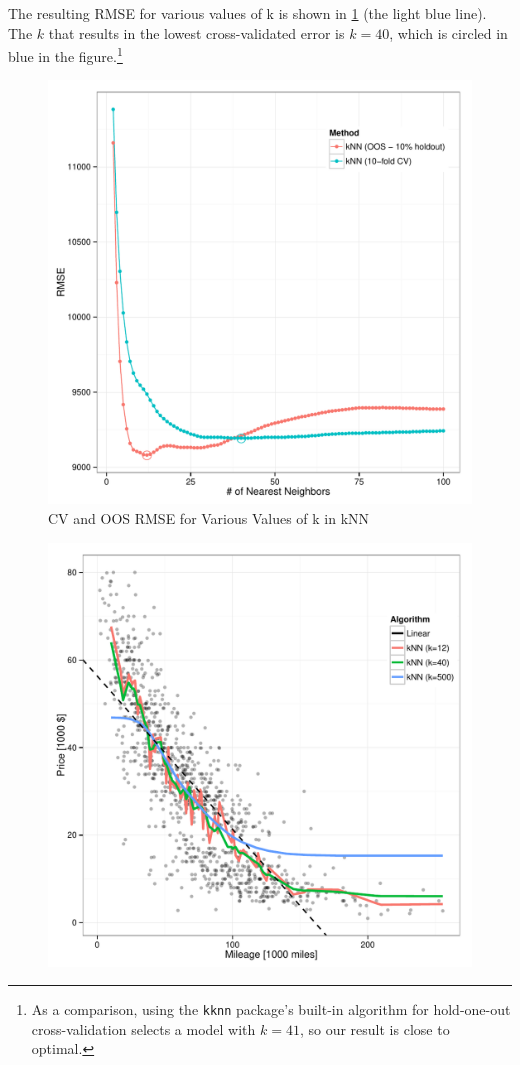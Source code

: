 \documentclass[11pt, fleqn, titlepage]{article}
\begin{document}
The resulting RMSE for various values of k is shown in \cref{fig:sweep} (the light blue line). The \(k\) that results in the lowest cross-validated error is \(k=40\), which is circled in blue in the figure.\footnote{As a comparison, using the \texttt{kknn} package's built-in algorithm for hold-one-out cross-validation selects a model with \(k=41\), so our result is close to optimal.}

\begin{figure}[!htb]
  \centering
  \includegraphics[scale=.5]{sweep_kknn.pdf}
  \caption{CV and OOS RMSE for Various Values of k in kNN}
  \label{fig:sweep}
\end{figure}

\begin{figure}[!htb]
  \centering
  \includegraphics[scale=.5]{pred_models.pdf}
  \caption{}
  \label{fig:models}
\end{figure}
\end{document}
